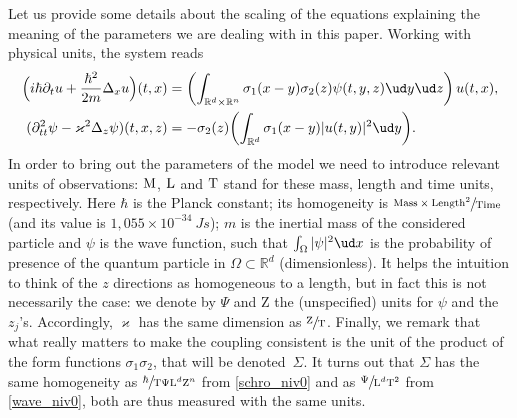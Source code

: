 Let us provide some details about the scaling of the equations
explaining the meaning of the parameters we are dealing with in this paper. Working with physical units, the system reads
\begin{subequations}
\begin{align}
\label{schro_niv0}
\Bigl(i\hbar \partial_{t}u+\frac{\hbar ^2}{2m}\Delta_{x}u\Bigr)(t,x)&=\left(\int_{\mathbb R^d\times\mathbb R^n}
\sigma_{1}(x-y) \sigma_{2}(z)\psi(t,y,z)\ud y\ud z\right)u(t,x),\\
\label{wave_niv0}(\partial_{tt}^{2}\psi-\varkappa^{2}\Delta_{z}\psi)(t,x,z)&=-\sigma_{2}(z)\biggl(\int_{\mathbb R^d} \sigma_{1}(x-y)|u(t,y)|^{2}
\ud y\biggr).
\end{align}
\end{subequations}
In order to bring out the parameters of the model we need to introduce relevant units of observations: $\textup M$, $\textup L$ and $\textup T$
stand for these mass, length and time units, respectively.
Here $\hbar $ is the Planck constant; its homogeneity is $\sfrac{\textup{Mass}\times \textup{Length}^2}{ \textup{Time}}$ (and its value is $1,055 \times10^{-34}\ J s$); $m$ is the inertial mass of the considered particle and $\psi$ is the wave function, such that $\int_\Omega |\psi|^2\ud x$ is
the probability of presence of the quantum particle in $\Omega\subset \mathbb R^d$ (dimensionless).
It helps the intuition to think of the $z$ directions as homogeneous to a length, but in fact this is not necessarily the case: we denote by $\Psi$ and $\mathrm Z$ the (unspecified) units for $\psi$ and the $z_j$'s. Accordingly, $\varkappa$ has the same dimension as $\sfrac{\mathrm Z}{\mathrm T}$.
Finally, we remark that what really matters to make the coupling consistent is the unit of the product of the form functions $\sigma_1\sigma_2$, that will be denoted~$\Sigma$. It turns out that $\Sigma $ has the same homogeneity
as
$\sfrac{\hbar }{ \mathrm T \Psi\mathrm L^d\mathrm Z^n}$
from \eqref{schro_niv0}
and
as $\sfrac{ \Psi}{\mathrm L^d \mathrm T^2}$
from \eqref{wave_niv0}, both are thus measured with the same units.

